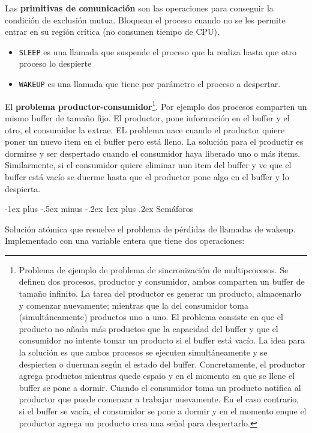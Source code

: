 \documentclass[10pt,portrait, twocolumn]{article}
\makeatletter
\renewcommand{\subsubsection}{\@startsection{subsubsection}{3}{0mm}%
                                {-1ex plus -.5ex minus -.2ex}%
                                {1ex plus .2ex}%
                                {\normalfont\small\bfseries}}
\makeatother
\begin{document}
Las \textbf{primitivas de comunicación} son las operaciones para conseguir la condición de exclusión mutua. Bloquean el proceso cuando no se les permite entrar en su región crítica (no consumen tiempo de CPU).

	\begin{itemize}
	\item \texttt{SLEEP} es una llamada que suspende el proceso que la realiza hasta que otro proceso lo despierte
	\item \texttt{WAKEUP} es una llamada que tiene por parámetro el proceso a despertar.
	\end{itemize}
	
El \textbf{problema productor-consumidor}\footnote{Problema de ejemplo de problema de sincronización de multipcocesos. Se definen dos procesos, productor y consumidor, ambos comparten un buffer de tamaño infinito. La tarea del productor es generar un producto, almacenarlo y comenzar nuevamente; mientras que la del consumidor toma (simultáneamente) productos uno a uno. El problema consiste en que el producto no añada más productos que la capacidad del buffer y que el consumidor no intente tomar un producto si el buffer está vacío. La idea para la solución es que ambos procesos se ejecuten simultáneamente y se despierten o duerman según el estado del buffer. Concretamente, el productor agrega productos mientras quede espaio y en el momento en que se llene el buffer se pone a dormir. Cuando el consumidor toma un producto notifica al productor que puede comenzar a trabajar nuevamente. En el caso contrario, si el buffer se vacía, el consumidor se pone a dormir y en el momento enque el productor agrega un producto crea una señal para despertarlo.}. Por ejemplo dos procesos comparten un mismo buffer de tamaño fijo. El productor, pone información en el buffer y el otro, el consumidor la extrae. EL problema nace cuando el productor quiere poner un nuevo item en el buffer pero está lleno. La solución para el productir es dormirse y ser despertado cuando el consumidor haya liberado uno o más items. Similarmente, si el consumidor quiere eliminar uun item del buffer y ve que el buffer está vacío se duerme hasta que el productor pone algo en el buffer y lo despierta.



\subsubsection{Semáforos}

Solución atómica que resuelve el problema de pérdidas de llamadas de wakeup. Implementado con una variable entera que tiene dos operaciones:
\end{document}
